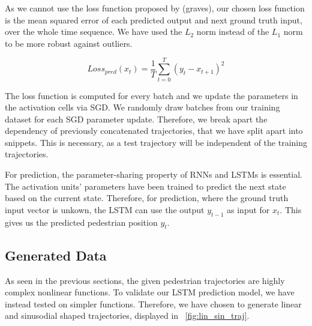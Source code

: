 As we cannot use the loss function proposed by (graves), our chosen loss function is the mean squared error of each predicted output and next ground truth input, over the whole time sequence.
We have used the $L_2$ norm instead of the $L_1$ norm to be more robust against outliers.

\begin{equation}
Loss_{pred}(x_t) = \frac{1}{T} \sum_{t=0}^{T}(y_t - x_{t+1})^2
\label{eq:loss_pred} 
\end{equation}

The loss function is computed for every batch and we update the parameters in the activation cells via SGD.
We randomly draw batches from our training dataset for each SGD parameter update.
Therefore, we break apart the dependency of previously concatenated trajectories, that we have split apart into snippets.
This is necessary, as a test trajectory will be independent of the training trajectories.

For prediction, the parameter-sharing property of RNNs and LSTMs is essential.
The activation units' parameters have been trained to predict the next state based on the current state.
Therefore, for prediction, where the ground truth input vector is unkown, the LSTM can use the output $y_{t-1}$ as input for $x_t$.
This gives us the predicted pedestrian position $y_t$.

\subsection{Generated Data}
As seen in the previous sections, the given pedestrian trajectories are highly complex nonlinear functions.
To validate our LSTM prediction model, we have instead tested on simpler functions. Therefore, we have chosen to generate linear and sinusodial shaped trajectories, displayed in ~\cref{fig:lin_sin_traj}.

